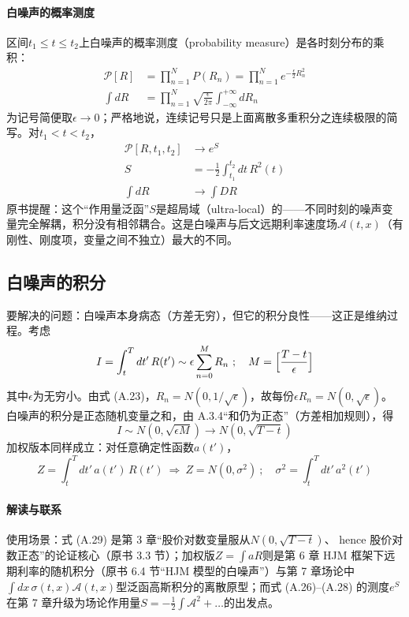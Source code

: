 \paragraph{白噪声的概率测度}
区间$t_1\le t\le t_2$上白噪声的概率测度（probability measure）是各时刻分布的乘积：
\begin{align*}
\mathcal{P}[R]&=\prod_{n=1}^{N}P(R_n)
=\prod_{n=1}^{N}e^{-\frac{\epsilon}{2}R_n^2}
\tag{A.25}\\
\int dR&=\prod_{n=1}^{N}\sqrt{\frac{\epsilon}{2\pi}}
\int_{-\infty}^{+\infty}dR_n
\end{align*}
为记号简便取$\epsilon\to0$；严格地说，连续记号只是上面离散多重积分之连续极限的简写。对$t_1<t<t_2$，
\begin{align*}
\mathcal{P}[R,t_1,t_2]&\to e^{S}
\tag{A.26}\\
S&=-\frac{1}{2}\int_{t_1}^{t_2}dt\,R^2(t)
\tag{A.27}\\
\int dR&\to\int DR
\tag{A.28}
\end{align*}
原书提醒：这个“作用量泛函”$S$是超局域（ultra-local）的——不同时刻的噪声变量完全解耦，积分没有相邻耦合。这是白噪声与后文远期利率速度场$\mathcal{A}(t,x)$（有刚性、刚度项，变量之间不独立）最大的不同。

\subsection{白噪声的积分}

要解决的问题：白噪声本身病态（方差无穷），但它的积分良性——这正是维纳过程。考虑
\begin{equation*}
I=\int_{t}^{T}dt'\,R(t')\sim\epsilon\sum_{n=0}^{M}R_n
\ ;\quad
M=\Bigl[\frac{T-t}{\epsilon}\Bigr]
\end{equation*}
其中$\epsilon$为无穷小。由式 (A.23)，$R_n=N(0,1/\sqrt{\epsilon})$，故每份$\epsilon R_n=N(0,\sqrt{\epsilon})$。白噪声的积分是正态随机变量之和，由 A.3.4“和仍为正态”（方差相加规则），得
\begin{equation*}
I\sim N(0,\sqrt{\epsilon M})\to N(0,\sqrt{T-t})
\tag{A.29}
\end{equation*}
加权版本同样成立：对任意确定性函数$a(t')$，
\begin{equation*}
Z=\int_{t}^{T}dt'\,a(t')\,R(t')
\ \Rightarrow\
Z=N(0,\sigma^2)\ ;\quad
\sigma^2=\int_{t}^{T}dt'\,a^2(t')
\end{equation*}

\paragraph{解读与联系}
使用场景：式 (A.29) 是第 3 章“股价对数变量服从$N(0,\sqrt{T-t})$、 hence 股价对数正态”的论证核心（原书 3.3 节）；加权版$Z=\int aR$则是第 6 章 HJM 框架下远期利率的随机积分（原书 6.4 节“HJM 模型的白噪声”）与第 7 章场论中$\int dx\,\sigma(t,x)\mathcal{A}(t,x)$型泛函高斯积分的离散原型；而式 (A.26)--(A.28) 的测度$e^{S}$在第 7 章升级为场论作用量$S=-\frac{1}{2}\int\mathcal{A}^2+\ldots$的出发点。

